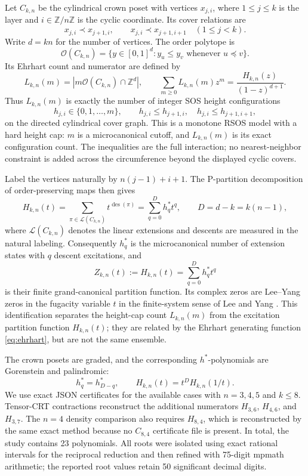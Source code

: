 \documentclass[11pt]{article}
\newcommand{\Z}{\mathbb{Z}}
\newcommand{\Ocal}{\mathcal{O}}
\begin{document}
Let $C_{k,n}$ be the cylindrical crown poset with vertices $x_{j,i}$, where $1\le j\le k$ is the layer and $i\in\Z/n\Z$ is the cyclic coordinate. Its cover relations are
\[
  x_{j,i}\prec x_{j+1,i},\qquad x_{j,i}\prec x_{j+1,i+1}
  \quad (1\le j<k).
\]
Write $d=kn$ for the number of vertices. The order polytope is
\[
  \Ocal(C_{k,n})=\{y\in[0,1]^d:y_u\le y_v\text{ whenever }u\preceq v\}.
\]
Its Ehrhart count and numerator are defined by
\begin{equation}
  L_{k,n}(m)=|m\Ocal(C_{k,n})\cap\Z^d|,
  \qquad
  \sum_{m\ge0}L_{k,n}(m)z^m=\frac{H_{k,n}(z)}{(1-z)^{d+1}}.
  \label{eq:ehrhart}
\end{equation}
Thus $L_{k,n}(m)$ is exactly the number of integer SOS height configurations
\[
  h_{j,i}\in\{0,1,\ldots,m\},\qquad
  h_{j,i}\le h_{j+1,i},\quad h_{j,i}\le h_{j+1,i+1},
  \label{eq:height-constraints}
\]
on the directed cylindrical cover graph. This is a monotone RSOS model with a hard height cap: $m$ is a microcanonical cutoff, and $L_{k,n}(m)$ is its exact configuration count. The inequalities are the full interaction; no nearest-neighbor constraint is added across the circumference beyond the displayed cyclic covers.

Label the vertices naturally by $n(j-1)+i+1$. The P-partition decomposition of order-preserving maps then gives
\begin{equation}
  H_{k,n}(t)=\sum_{\pi\in\mathcal{L}(C_{k,n})}t^{\operatorname{des}(\pi)}
  =\sum_{q=0}^{D}h_q^*t^q,
  \qquad D=d-k=k(n-1),
  \label{eq:partition}
\end{equation}
where $\mathcal{L}(C_{k,n})$ denotes the linear extensions and descents are measured in the natural labeling. Consequently $h_q^*$ is the microcanonical number of extension states with $q$ descent excitations, and
\[
  Z_{k,n}(t):=H_{k,n}(t)=\sum_{q=0}^{D}h_q^*t^q
\]
is their finite grand-canonical partition function. Its complex zeros are Lee--Yang zeros in the fugacity variable $t$ in the finite-system sense of Lee and Yang \cite{LeeYang1952}. This identification separates the height-cap count $L_{k,n}(m)$ from the excitation partition function $H_{k,n}(t)$; they are related by the Ehrhart generating function \eqref{eq:ehrhart}, but are not the same ensemble.

The crown posets are graded, and the corresponding $h^*$-polynomials are Gorenstein and palindromic:
\begin{equation}
  h_q^*=h_{D-q}^*,\qquad H_{k,n}(t)=t^D H_{k,n}(1/t).
  \label{eq:reciprocal}
\end{equation}
We use exact JSON certificates for the available cases with $n=3,4,5$ and $k\le8$. Tensor-CRT contractions reconstruct the additional numerators $H_{3,6}$, $H_{4,6}$, and $H_{3,7}$. The $n=4$ density comparison also requires $H_{8,4}$, which is reconstructed by the same exact method because no $C_{8,4}$ certificate file is present. In total, the study contains 23 polynomials. All roots were isolated using exact rational intervals for the reciprocal reduction and then refined with 75-digit mpmath arithmetic; the reported root values retain 50 significant decimal digits.
\end{document}
